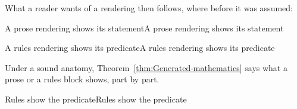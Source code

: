 \documentclass[acmsmall,screen,review,anonymous,nonacm]{acmart}
\begin{document}
What a reader wants of a rendering then follows, where before it was
assumed:

\begin{leantheorem}[sum=NswPd9M_rm]{A prose rendering shows its statement}{A prose rendering shows its statement}
\label{thm:A-prose-rendering-shows-its-statement}
\end{leantheorem}

\begin{leantheorem}[sum=CDO76CT5mo]{A rules rendering shows its predicate}{A rules rendering shows its predicate}
\label{thm:A-rules-rendering-shows-its-predicate}
\end{leantheorem}

Under a sound anatomy, Theorem~\ref{thm:Generated-mathematics} says what a
prose or a rules block shows, part by part.

\begin{leantheorem}[sum=5g-OnsOt4_]{Rules show the predicate}{Rules show the predicate}
\label{thm:Rules-show-the-predicate}
\end{leantheorem}
\end{document}
